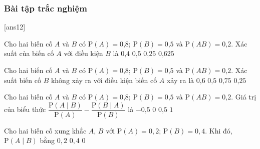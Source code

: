 \subsubsection{Bài tập trắc nghiệm}
\setcounter{ex}{0}
[ans12]
\begin{ex}%
	Cho hai biến cố $A$ và $B$ có $\mathrm{P}(A)=0\text{,}8$; $\mathrm{P}(B)=0\text{,}5$ và $\mathrm{P}(A B)=0\text{,}2$. Xác suất của biến cố $A$ với điều kiện $B$ là
	\choice
	{\True$0\text{,}4$}
	{$0\text{,}5$}
	{$0\text{,}25$}
	{$0\text{,}625$}
\end{ex}

\begin{ex}%
	Cho hai biến cố $A$ và $B$ có $\mathrm{P}(A)=0\text{,}8$; $\mathrm{P}(B)=0\text{,}5$ và $\mathrm{P}(A B)=0\text{,}2$. Xác suất biến cố $B$ không xảy ra với điều kiện biến cố $A$ xảy ra là
	\choice
	{$0\text{,}6$}
	{$0\text{,}5$}
	{\True$0\text{,}75$}
	{$0\text{,}25$}
\end{ex}

\begin{ex}%
	Cho hai biến cố $A$ và $B$ có $\mathrm{P}(A)=0\text{,}8$; $\mathrm{P}(B)=0\text{,}5$ và $\mathrm{P}(A B)=0\text{,}2$. Giá trị của biểu thức $
	\dfrac{\mathrm{P}(A \mid B)}{\mathrm{P}(A)}-\dfrac{\mathrm{P}(B \mid A)}{\mathrm{P}(B)}$ là
	\choice
	{$-0\text{,}5$}
	{\True$0$}
	{$0\text{,}5$}
	{$1$}
\end{ex}

\begin{ex}
	Cho hai biến cố xung khắc $A$, $B$ với $\mathrm{P}(A)=0{,}2$; $\mathrm{P}(B)=0{,}4$. Khi đó, $\mathrm{P}(A\mid B)$ bằng
	{$0{,}2$}
	{$0{,}4$}
	{$0$}
\end{ex}

